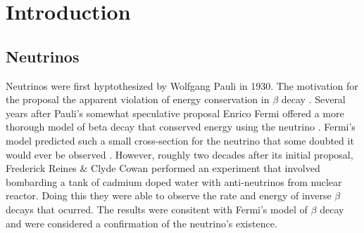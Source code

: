 
\chapter{Introduction}

\ifpdf
    \graphicspath{{introduction/figures/PNG/}{introduction/figures/PDF/}{introduction/figures/}}
\else
    \graphicspath{{introduction/figures/EPS/}{introduction/figures/}}
\fi


\section{Neutrinos}
Neutrinos were first hyptothesized by Wolfgang Pauli in 1930.
The motivation for the proposal the apparent violation of energy
conservation in $\beta$ decay \citep{pauli_letter}.
Several years after Pauli's somewhat speculative proposal Enrico Fermi offered
a more thorough model of beta decay that conserved energy using the neutrino
\citep{fermi_beta_decay}.
Fermi's model predicted such a small cross-section for the neutrino that some
doubted it would ever be observed \citep{bethe_impossible_to_observe}.
However, roughly two decades after its initial proposal, Frederick Reines \&
Clyde Cowan performed an experiment that involved bombarding a tank of cadmium
doped water with anti-neutrinos from nuclear reactor.
Doing this they were able to observe the rate and energy of inverse $\beta$
decays that ocurred.
The results were consitent with Fermi's model of $\beta$ decay and were
considered a confirmation of the neutrino's existence.


